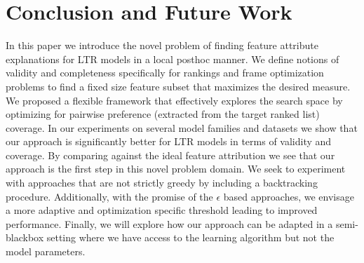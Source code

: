 \chapter{Conclusion and Future Work}\label{ch:Conclusion}
In this paper we introduce the novel problem of finding feature attribute explanations for LTR models in a local posthoc manner. We define notions of validity and completeness specifically for rankings and frame optimization problems to find a fixed size feature subset that maximizes the desired measure. We proposed a flexible framework that effectively explores the search space by optimizing for pairwise preference (extracted from the target ranked list) coverage. In our experiments on several model families and datasets we show that our approach is significantly better for LTR models in terms of validity and coverage. By comparing against the ideal feature attribution we see that our approach is the first step in this novel problem domain. We seek to experiment with approaches that are not strictly greedy by including a backtracking procedure. Additionally, with the promise of the $\epsilon$ based approaches, we envisage a more adaptive and optimization specific threshold leading to improved performance. Finally, we will explore how our approach can be adapted in a semi-blackbox setting where we have access to the learning algorithm but not the model parameters.